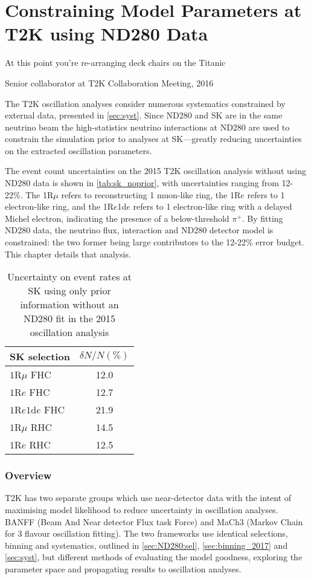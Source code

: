\chapter{Constraining Model Parameters at T2K using ND280 Data}
\label{chap:ND280}

\epigraph{At this point you're re-arranging deck chairs on the Titanic}{Senior collaborator at T2K Collaboration Meeting, 2016}

The T2K oscillation analyses consider numerous systematics constrained by external data, presented in \autoref{sec:syst}. Since ND280 and SK are in the same neutrino beam the high-statistics neutrino interactions at ND280 are used to constrain the simulation prior to analyses at SK---greatly reducing uncertainties on the extracted oscillation parameters. 

The event count uncertainties on the 2015 T2K oscillation analysis without using ND280 data is shown in \autoref{tab:sk_noprior}, with uncertainties ranging from 12-22\%. The 1R$\mu$ refers to reconstructing 1 muon-like ring, the 1R$e$ refers to 1 electron-like ring, and the 1R$e$1d$e$ refers to 1 electron-like ring with a delayed Michel electron, indicating the presence of a below-threshold $\pi^+$. By fitting ND280 data, the neutrino flux, interaction and ND280 detector model is constrained: the two former being large contributors to the 12-22\% error budget. This chapter details that analysis.
\begin{table}[h]
	\begin{tabular}{l | c}
		\hline
		\hline
		SK selection & $\delta N/N (\%)$ \\
		\hline
		$1\text{R}\mu$ FHC & 12.0 \\
		$1\text{R}e$ FHC & 12.7 \\
		$1\text{R}e1\text{d}e$ FHC & 21.9 \\
		\hline
		$1\text{R}\mu$ RHC & 14.5 \\
		$1\text{R}e$ RHC & 12.5 \\
		\hline
		\hline
	\end{tabular}
	\caption{Uncertainty on event rates at SK using only prior information without an ND280 fit in the 2015 oscillation analysis\cite{t2k_2015}}
	\label{tab:sk_noprior}
\end{table}

\subsection{Overview}
T2K has two separate groups which use near-detector data with the intent of maximising model likelihood to reduce uncertainty in oscillation analyses. BANFF (Beam And Near detector Flux task Force) and MaCh3 (Markov Chain for 3 flavour oscillation fitting). The two frameworks use identical selections, binning and systematics, outlined in \autoref{sec:ND280:sel}, \autoref{sec:binning_2017} and \autoref{sec:syst}, but different methods of evaluating the model goodness, exploring the parameter space and propagating results to oscillation analyses.

